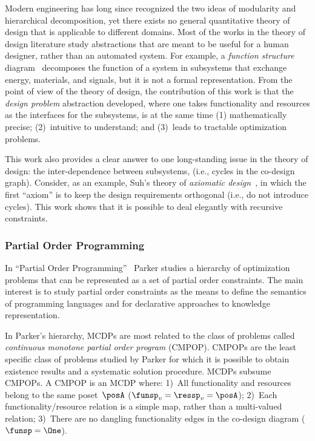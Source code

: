 Modern engineering has long since recognized the two ideas of modularity
and hierarchical decomposition, yet there exists no general quantitative
theory of design that is applicable to different domains. Most of
the works in the theory of design literature study abstractions that
are meant to be useful for a human designer, rather than an automated
system. For example, a \emph{function structure }diagram~\cite[p. 32]{pahl07}
decomposes the function of a system in subsystems that exchange energy,
materials, and signals, but it is not a formal representation. From
the point of view of the theory of design, the contribution of this
work is that the \emph{design problem }abstraction developed, where
one takes functionality and resources as the interfaces for the subsystems,
is at the same time (1) mathematically precise; (2)~intuitive to
understand; and (3)~leads to tractable optimization problems.

This work also provides a clear answer to one long-standing issue
in the theory of design: the inter-dependence between subsystems,
(i.e., cycles in the co-design graph). Consider, as an example, Suh's
theory of \emph{axiomatic design~}\cite{suh01}, in which the first
``axiom'' is to keep the design requirements orthogonal (i.e., do
not introduce cycles). This work shows that it is possible to deal
elegantly with recursive constraints.


\subsubsection*{Partial Order Programming}

In ``Partial Order Programming''~\cite{parkerjr89partial} Parker
studies a hierarchy of optimization problems that can be represented
as a set of partial order constraints. The main interest is to study
partial order constraints as the means to define the semantics of
programming languages and for declarative approaches to knowledge
representation.

In Parker's hierarchy, MCDPs are most related to the class of problems
called \emph{continuous monotone partial order program} (CMPOP). CMPOPs
are the least specific class of problems studied by Parker for which
it is possible to obtain existence results and a systematic solution
procedure. MCDPs subsume CMPOPs. A CMPOP is an MCDP where: 1)~All
functionality and resources belong to the same poset~$\posA$ ($\funsp_{v}=\ressp_{v}=\posA$);
2)~Each functionality/resource relation is a simple map, rather than
a multi-valued relation; 3)~There are no dangling functionality edges
in the co-design diagram ($\funsp=\One$).

